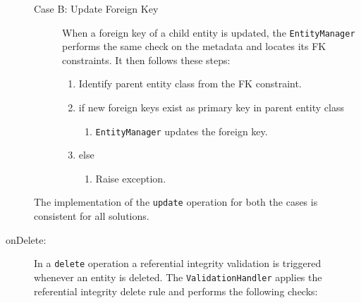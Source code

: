 \begin{description}
\begin{description}
		 
		\item[Case B: Update Foreign Key] When a foreign key of a child entity is
		updated, the  \texttt{EntityManager} performs the same check on the
		metadata and locates its \ac{FK} constraints. It then follows these steps:
		\begin{enumerate}
		  \item Identify parent entity class from the \ac{FK} constraint.
		  \item if new foreign keys exist as primary key in parent entity class
			\begin{enumerate}
				\item \texttt{EntityManager} updates  the foreign key.
			\end{enumerate}
		  \item else 
			\begin{enumerate}
				\item Raise exception.
			\end{enumerate}
		\end{enumerate}

	
		
		\end{description}
		The implementation of the \texttt{update} operation for both the cases is
		consistent for all solutions.
		
		\item[onDelete:] In a \texttt{delete} operation a referential
		integrity validation is triggered whenever an entity is deleted. The
		\texttt{ValidationHandler} applies the referential integrity delete rule
		and performs the following checks:
		\renewcommand{\labelenumii}{\arabic{enumi}.\arabic{enumii}}
		\renewcommand{\labelenumiii}{\arabic{enumi}.\arabic{enumii}.\arabic{enumiii}}
		

\end{description}

